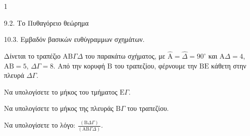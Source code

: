 \begin{ylh}{1}
    \item 9.2. Το Πυθαγόρειο θεώρημα
    \item 10.3. Εμβαδόν βασικών ευθύγραμμων σχημάτων.
\end{ylh}
\begin{figure}
\end{figure}
Δίνεται το τραπέζιο $\text{AB}\Gamma\Delta$ του παρακάτω σχήματος, με $\hat{\text{A}} = \hat{\Delta} = 90^\circ$ και $\text{A}\Delta = 4$, $\text{AB} = 5$, $\Delta\Gamma = 8$. Από την κορυφή $\text{B}$ του τραπεζίου, φέρνουμε την $\text{BE}$ κάθετη στην πλευρά $\Delta\Gamma$.
\begin{alist}
\item Να υπολογίσετε το μήκος του τμήματος $\text{E}\Gamma$. 
\item Να υπολογίσετε το μήκος της πλευράς $\text{B}\Gamma$ του τραπεζίου. 
\item Να υπολογίσετε το λόγο: $\frac{(\text{B}\Delta\Gamma)}{(\text{AB}\Gamma\Delta)}$. 
\end{alist}
